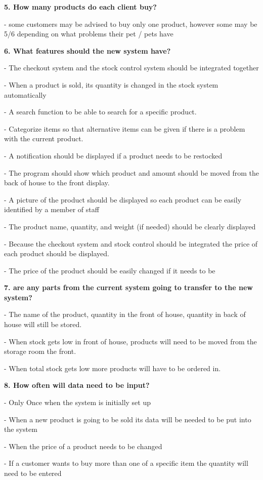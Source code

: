 \begin{flushleft}
\textbf{5. How many products do each client buy?}\par
- some customers may be advised to buy only one product, however some may be 5/6 depending on what problems their pet / pets have\par

\textbf{6. What features should the new system have?}\par
- The checkout system and the stock control system should be integrated together\par
- When a product is sold, its quantity is changed in the stock system automatically\par
- A search function to be able to search for a specific product.\par
- Categorize items so that alternative items can be given if there is a problem with the current product.\par
- A notification should be displayed if a product needs to be restocked\par
- The program should show which product and amount should be moved from the back of house to the front display.\par
- A picture of the product should be displayed so each product can be easily identified by a member of staff\par
- The product name, quantity, and weight (if needed) should be clearly displayed\par
- Because the checkout system and stock control should be integrated the price of each product should be displayed.\par
- The price of the product should be easily changed if it needs to be\par

\textbf{7. are any parts from the current system going to transfer to the new system?}\par
- The name of the product, quantity in the front of house, quantity in back of house will still be stored.\par
- When stock gets low in front of house, products will need to be moved from the storage room the front.\par
- When total stock gets low more products will have to be ordered in.\par

\textbf{8. How often will data need to be input?}\par
- Only Once when the system is initially set up\par
- When a new product is going to be sold its data will be needed to be put into the system\par
- When the price of a product needs to be changed\par
- If a customer wants to buy more than one of a specific item the quantity will need to be entered\par


\end{flushleft}
